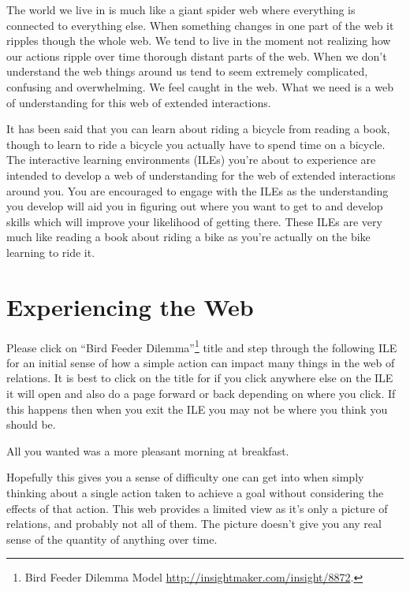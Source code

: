 \documentclass[]{memoir}
\begin{document}
The world we live in is much like a giant spider web where everything is
connected to everything else. When something changes in one part of the
web it ripples though the whole web. We tend to live in the moment not
realizing how our actions ripple over time thorough distant parts of the
web. When we don't understand the web things around us tend to seem
extremely complicated, confusing and overwhelming. We feel caught in the
web. What we need is a web of understanding for this web of extended
interactions.

It has been said that you can learn about riding a bicycle from reading
a book, though to learn to ride a bicycle you actually have to spend
time on a bicycle. The interactive learning environments (ILEs) you're
about to experience are intended to develop a web of understanding for
the web of extended interactions around you. You are encouraged to
engage with the ILEs as the understanding you develop will aid you in
figuring out where you want to get to and develop skills which will
improve your likelihood of getting there. These ILEs are very much like
reading a book about riding a bike as you're actually on the bike
learning to ride it.

\section{Experiencing the Web}

Please click on ``Bird Feeder Dilemma''\footnote{Bird Feeder Dilemma
  Model \url{http://insightmaker.com/insight/8872}.} title and step
through the following ILE for an initial sense of how a simple action
can impact many things in the web of relations. It is best to click on
the title for if you click anywhere else on the ILE it will open and
also do a page forward or back depending on where you click. If this
happens then when you exit the ILE you may not be where you think you
should be.

\FloatBarrier 

\begin{model}[frametitle={Model: Bird Feeder Dilemma}] 

 All you wanted was a more pleasant morning at breakfast.




 \end{model}

Hopefully this gives you a sense of difficulty one can get into when
simply thinking about a single action taken to achieve a goal without
considering the effects of that action. This web provides a limited view
as it's only a picture of relations, and probably not all of them. The
picture doesn't give you any real sense of the quantity of anything over
time.
\end{document}
